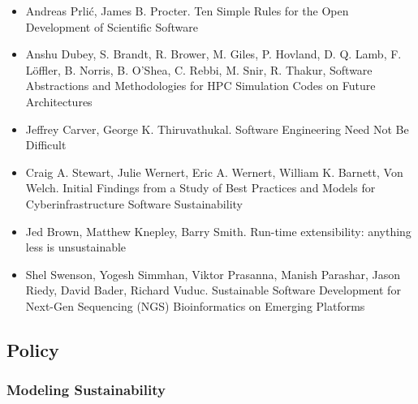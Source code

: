 \documentclass[11pt, oneside]{amsart}
\begin{document}
\begin{itemize}

\item Andreas Prli\'{c}, James B. Procter. Ten Simple Rules for the
  Open Development of Scientific Software~\cite{Prlic_WSSSPE}

\item Anshu Dubey, S. Brandt, R. Brower, M. Giles, P. Hovland,
  D. Q. Lamb, F. Löffler, B. Norris, B. O'Shea, C. Rebbi, M. Snir,
  R. Thakur, Software Abstractions and Methodologies for HPC
  Simulation Codes on Future Architectures~\cite{Dubey2_WSSSPE}

\item Jeffrey Carver, George K. Thiruvathukal. Software Engineering
  Need Not Be Difficult~\cite{Carver_WSSSPE}

\item Craig A. Stewart, Julie Wernert, Eric A. Wernert, William
  K. Barnett, Von Welch. Initial Findings from a Study of Best
  Practices and Models for Cyberinfrastructure Software Sustainability~\cite{Stewart_WSSSPE}

\item Jed Brown, Matthew Knepley, Barry Smith. Run-time extensibility:
  anything less is unsustainable~\cite{Brown_WSSSPE}

\item Shel Swenson, Yogesh Simmhan, Viktor Prasanna, Manish Parashar,
  Jason Riedy, David Bader, Richard Vuduc. Sustainable Software
  Development for Next-Gen Sequencing (NGS) Bioinformatics on Emerging
  Platforms~\cite{Swenson_WSSSPE}

\end{itemize}

\subsection*{Policy}

\subsubsection*{Modeling Sustainability}
\end{document}
